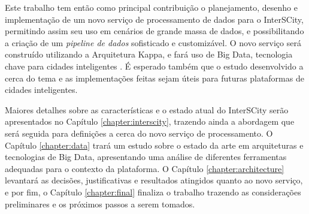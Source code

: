 Este trabalho tem então como principal contribuição o planejamento, desenho e
implementação de um novo serviço de processamento de dados para o InterSCity,
permitindo assim seu uso em cenários de grande massa de dados, e possibilitando
a criação de um \textit{pipeline de dados} sofisticado e customizável. O novo
serviço será construído utilizando a Arquitetura Kappa, e fará uso de
Big Data, tecnologia chave para cidades inteligentes
\cite{batty2012smart}. É esperado também que o estudo desenvolvido a cerca do
tema e as implementações feitas sejam úteis para futuras plataformas de cidades
inteligentes.

Maiores detalhes sobre as características e o estado atual do InterSCity serão
apresentados no Capítulo \ref{chapter:interscity}, trazendo ainda a abordagem que será
seguida para definições a cerca do novo serviço de processamento. O Capítulo
\ref{chapter:data} trará um estudo sobre o estado da arte em arquiteturas e
tecnologias de Big Data, apresentando uma análise de diferentes ferramentas
adequadas para o contexto da plataforma. O Capítulo \ref{chapter:architecture}
levantará as decisões, justificativas e resultados atingidos quanto ao novo
serviço, e por fim, o Capítulo \ref{chapter:final} finaliza o trabalho
trazendo as considerações preliminares e os próximos passos a serem tomados.
